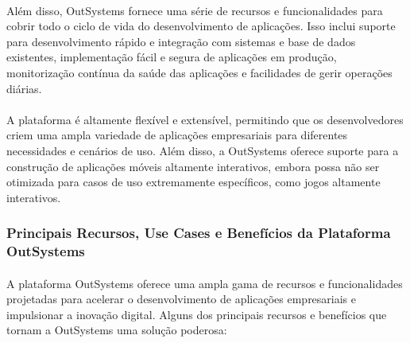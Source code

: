 \documentclass[pdflatex,sn-mathphys-num]{sn-jnl}
\theoremstyle{thmstyleone}
\theoremstyle{thmstyletwo}
\theoremstyle{thmstylethree}
\begin{document}
\paragraph{}Além disso, OutSystems fornece uma série de recursos e funcionalidades para cobrir todo o ciclo de vida do desenvolvimento de aplicações. Isso inclui suporte para desenvolvimento rápido e integração com sistemas e base de dados existentes, implementação fácil e segura de aplicações em produção, monitorização contínua da saúde das aplicações e facilidades de gerir operações diárias.\cite{bib11}

\paragraph{}A plataforma é altamente flexível e extensível, permitindo que os desenvolvedores criem uma ampla variedade de aplicações empresariais para diferentes necessidades e cenários de uso. Além disso, a OutSystems oferece suporte para a construção de aplicações móveis altamente interativos, embora possa não ser otimizada para casos de uso extremamente específicos, como jogos altamente interativos.\cite{bib10}

\subsubsection{Principais Recursos, Use Cases e Benefícios da Plataforma OutSystems}\label{subsubsec}
\paragraph{}A plataforma OutSystems oferece uma ampla gama de recursos e funcionalidades projetadas para acelerar o desenvolvimento de aplicações empresariais e impulsionar a inovação digital. Alguns dos principais recursos e benefícios que tornam a OutSystems uma solução poderosa:
\end{document}
